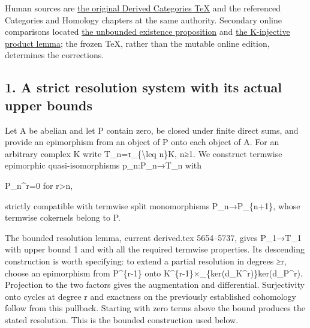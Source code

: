 \documentclass[11pt]{article}
\begin{document}
Human sources are \href{https://github.com/stacks/stacks-project/blob/a04446e57ec1fbc252a871afcec7752fb2807b14/derived.tex\#L9206}{the original Derived Categories TeX} and the referenced Categories and Homology chapters at the same authority. Secondary online comparisons located \href{https://stacks.math.columbia.edu/tag/0794}{the unbounded existence proposition} and \href{https://stacks.math.columbia.edu/tag/0BK6}{the K-injective product lemma}; the frozen TeX,\allowbreak{} rather than the mutable online edition,\allowbreak{} determines the corrections.

\subsection{1. A strict resolution system with its actual upper bounds}\label{proofs-9206-9744-a-strict-resolution-system-with-its-actual-upper-bounds}

Let A be abelian and let P contain zero,\allowbreak{} be closed under finite direct sums,\allowbreak{} and provide an epimorphism from an object of P onto each object of A. For an arbitrary complex K write T\_\allowbreak{}n\allowbreak{}=τ\_\allowbreak{}\{\textbackslash{}leq n\}K,\allowbreak{} n≥1. We construct termwise epimorphic quasi-isomorphisms p\_\allowbreak{}n:\allowbreak{}P\_\allowbreak{}n\allowbreak{}→T\_\allowbreak{}n with

P\_\allowbreak{}n\textasciicircum{}r\allowbreak{}=0 for r>n,\allowbreak{}

strictly compatible with termwise split monomorphisms P\_\allowbreak{}n\allowbreak{}→P\_\allowbreak{}\{n\allowbreak{}+1\},\allowbreak{} whose termwise cokernels belong to P.

The bounded resolution lemma,\allowbreak{} current derived.tex 5654–\allowbreak{}5737,\allowbreak{} gives P\_\allowbreak{}1\allowbreak{}→T\_\allowbreak{}1 with upper bound 1 and with all the required termwise properties. Its descending construction is worth specifying:\allowbreak{} to extend a partial resolution in degrees ≥r,\allowbreak{} choose an epimorphism from P\^{}\{r-1\} onto K\textasciicircum{}\{r-1\}×\_\allowbreak{}\{ker(d\_\allowbreak{}K\textasciicircum{}r)\allowbreak{}\}ker(d\_\allowbreak{}P\textasciicircum{}r)\allowbreak{}. Projection to the two factors gives the augmentation and differential. Surjectivity onto cycles at degree r and exactness on the previously established cohomology follow from this pullback. Starting with zero terms above the bound produces the stated resolution. This is the bounded construction used below.
\end{document}
